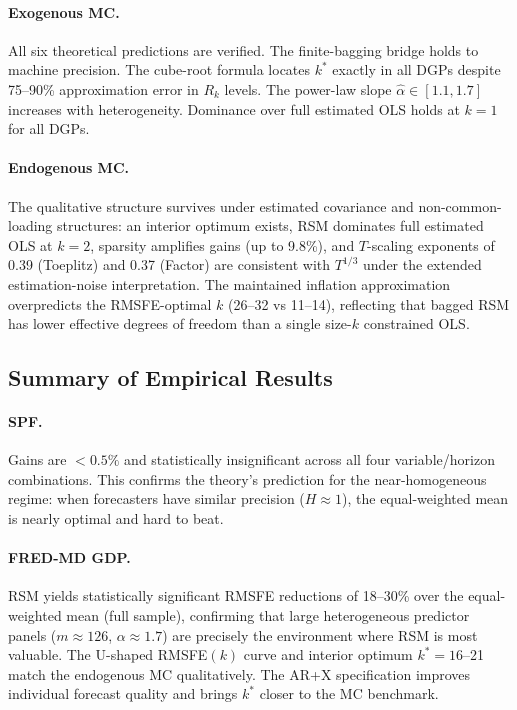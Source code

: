 \documentclass[12pt,a4paper]{article}
\theoremstyle{definition}
\begin{document}
\paragraph{Exogenous MC.}
All six theoretical predictions are verified. The finite-bagging bridge holds
to machine precision. The cube-root formula locates $k^*$ exactly in all
DGPs despite 75--90\% approximation error in $R_k$ levels. The power-law
slope $\hat\alpha\in[1.1,1.7]$ increases with heterogeneity. Dominance over
full estimated OLS holds at $k=1$ for all DGPs.

\paragraph{Endogenous MC.}
The qualitative structure survives under estimated covariance and
non-common-loading structures: an interior optimum exists, RSM dominates
full estimated OLS at $k=2$, sparsity amplifies gains (up to 9.8\%), and
$T$-scaling exponents of 0.39 (Toeplitz) and 0.37 (Factor) are consistent
with $T^{1/3}$ under the extended estimation-noise interpretation. The
maintained inflation approximation overpredicts the RMSFE-optimal $k$
(26--32 vs 11--14), reflecting that bagged RSM has lower effective degrees
of freedom than a single size-$k$ constrained OLS.

\subsection{Summary of Empirical Results}

\paragraph{SPF.}
Gains are $<0.5\%$ and statistically insignificant across all four
variable/horizon combinations. This confirms the theory's prediction for
the near-homogeneous regime: when forecasters have similar precision
($H\approx1$), the equal-weighted mean is nearly optimal and hard to beat.

\paragraph{FRED-MD GDP.}
RSM yields statistically significant RMSFE reductions of 18--30\% over the
equal-weighted mean (full sample), confirming that large heterogeneous
predictor panels ($m\approx126$, $\alpha\approx1.7$) are precisely the
environment where RSM is most valuable. The U-shaped RMSFE$(k)$ curve and
interior optimum $k^*=16$--21 match the endogenous MC qualitatively. The
AR+X specification improves individual forecast quality and brings $k^*$
closer to the MC benchmark.
\end{document}

